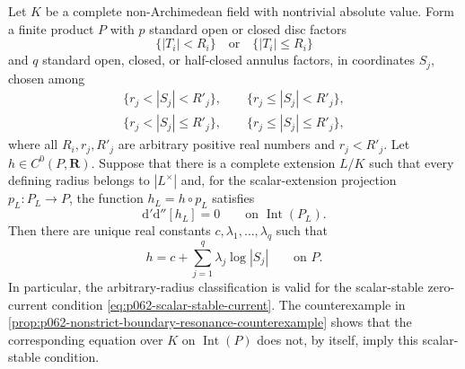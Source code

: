 \begin{proposition}\label{prop:p062-nonstrict-scalar-stable-repair}
Let \(K\) be a complete non-Archimedean field with nontrivial absolute
value.  Form a finite product \(P\) with \(p\) standard open or closed
disc factors
\[
             \{|T_i|<R_i\}\quad\text{or}\quad\{|T_i|\leq R_i\}
\]
and \(q\) standard open, closed, or half-closed annulus factors, in
coordinates \(S_j\), chosen among
\[
\begin{gathered}
 \{r_j<|S_j|<R'_j\},\qquad
 \{r_j\leq|S_j|<R'_j\},\\
 \{r_j<|S_j|\leq R'_j\},\qquad
 \{r_j\leq|S_j|\leq R'_j\},
\end{gathered}
\]
where all \(R_i,r_j,R'_j\) are arbitrary positive real numbers and
\(r_j<R'_j\).
Let \(h\in C^0(P,\mathbf R)\).  Suppose that there is a complete extension
\(L/K\) such that every defining radius belongs to \(|L^\times|\) and,
for the scalar-extension projection \(p_L:P_L\to P\), the function
\(h_L=h\circ p_L\) satisfies
\begin{equation}\label{eq:p062-scalar-stable-current}
            \mathrm d'\mathrm d''[h_L]=0
            \qquad\text{on }\operatorname{Int}(P_L).
\end{equation}
Then there are unique real constants
\(c,\lambda_1,\ldots,\lambda_q\) such that
\begin{equation}\label{eq:p062-scalar-stable-affine}
              h=c+\sum_{j=1}^q\lambda_j\log|S_j|
              \qquad\text{on }P.
\end{equation}
In particular, the arbitrary-radius classification is valid for the
scalar-stable zero-current condition \eqref{eq:p062-scalar-stable-current}.
The counterexample in
\cref{prop:p062-nonstrict-boundary-resonance-counterexample} shows that
the corresponding equation over \(K\) on
\(\operatorname{Int}(P)\) does not, by itself, imply this scalar-stable
condition.
\end{proposition}
